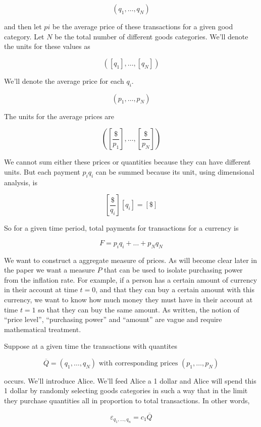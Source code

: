 \[
    \left( q_1, \dots, q_N \right)
\]

and then let $pi$ be the average price of these transactions for a given good category. Let $N$ be
the total number of different goods categories. We'll denote the units for these values as

\[
    \left( \left[ q_1 \right], \dots, \left[ q_N \right] \right)
\]

We'll denote the average price for each $q_i$.

\[
    \left( p_1, \dots, p_N \right)
\]

The units for the average prices are 

\[
    \left( \left[ \frac {\$} {p_1} \right], \dots, \left[ \frac {\$} {p_N} \right]  \right)
\]

We cannot sum either these prices or quantities because they can have different units. But each
payment $p_i q_i$ can be summed because its unit, using dimensional analysis, is

\[
    \left[ \frac {\$} {q_i} \right] \left[ q_i \right] = \left[ \$ \right]
\]

So for a given time period, total payments for transactions for a currency is 

\[
    F = p_i q_i + \dots + p_N q_N
\]

We want to construct a aggregate measure of prices. As will become clear later in the paper we want
a measure $P$ that can be used to isolate purchasing power from the inflation rate. For example, if
a person has a certain amount of currency in their account at time $t=0$, and that they can buy a
certain amount with this currency, we want to know how much money they must have in their account at
time $t=1$ so that they can buy the same amount. As written, the notion of ``price level'',
``purchasing power'' and ``amount'' are vague and require mathematical treatment.

Suppose at a given time the transactions with quantites

\[
    \overline Q = \left( q_1, \dots, q_N \right) \textrm{ with corresponding prices } \left( p_1, \dots, p_N \right)
\]

occurs. We'll introduce Alice. We'll feed Alice a 1 dollar and Alice will spend this 1 dollar by
randomly selecting goods categories in such a way that in the limit they purchase quantities all in
proportion to total transactions. In other words,

\[
    \varepsilon_{q_1,\dots,q_n} = c_1 \overline Q
\]

